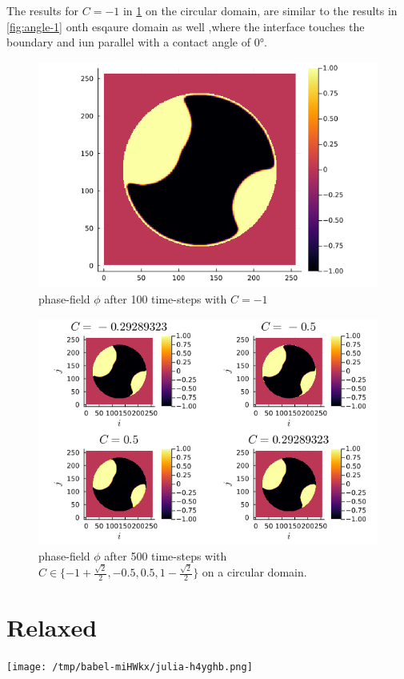 \documentclass{mimosis}
\begin{document}
The results for \(C=-1\) in \ref{fig:angle-1c} on the circular domain, are similar to the results in \ref{fig:angle-1}  onth esqaure domain as well ,where the interface touches the boundary and iun parallel with a contact angle of 0°.
\begin{figure}[htbp]
\centering
\includegraphics[width=.9\linewidth]{images/angle-1c.png}
\caption{\label{fig:angle-1c}phase-field \(\phi\) after 100 time-steps with \(C=-1\)}
\end{figure}


\begin{figure}[htbp]
\centering
\includegraphics[width=.9\linewidth]{images/angle-multiplec.png}
\caption{\label{fig:angle-multiplec}phase-field \(\phi\) after 500 time-steps with \(C \in \{-1 + \frac{\sqrt{2}}{2} , -0.5 , 0.5 , 1 - \frac{\sqrt{2}}{2} \}\) on a circular domain.}
\end{figure}
\chapter{Relaxed}
\label{sec:org0665ca4}
\begin{center}
\texttt{[image: /tmp/babel-miHWkx/julia-h4yghb.png]}
\label{}
\end{center}
\end{document}
